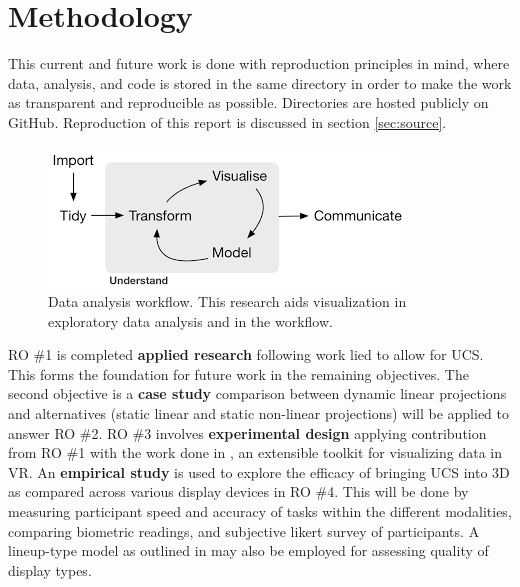 \documentclass{monashthesis}
\begin{document}
\section{Methodology}\label{methodology}

This current and future work is done with reproduction principles in
mind, where data, analysis, and code is stored in the same directory in
order to make the work as transparent and reproducible as possible.
Directories are hosted publicly on GitHub. Reproduction of this report
is discussed in section \ref{sec:source}.




\begin{figure}

{\centering \includegraphics[width=1\linewidth]{./figures/data_analysis_workflow} 

}

\caption{Data analysis workflow. This research
aids visualization in exploratory data analysis and in the workflow.}\label{fig:dataanalysisworkflow}
\end{figure}

RO \#1 is completed \textbf{applied research} following work lied
\autocite{cook_manual_1997} to allow for UCS. This forms the foundation
for future work in the remaining objectives. The second objective is a
\textbf{case study} comparison between dynamic linear projections and
alternatives (static linear and static non-linear projections) will be
applied to answer RO \#2. RO \#3 involves \textbf{experimental design}
applying contribution from RO \#1 with the work done in
\textcite{cordeil_immersive_2019}, an extensible toolkit for visualizing
data in VR. An \textbf{empirical study} is used to explore the efficacy
of bringing UCS into 3D as compared across various display devices in RO
\#4. This will be done by measuring participant speed and accuracy of
tasks within the different modalities, comparing biometric readings, and
subjective likert survey of participants. A lineup-type model as
outlined in \textcite{hofmann_graphical_2012} may also be employed for
assessing quality of display types.
\end{document}

